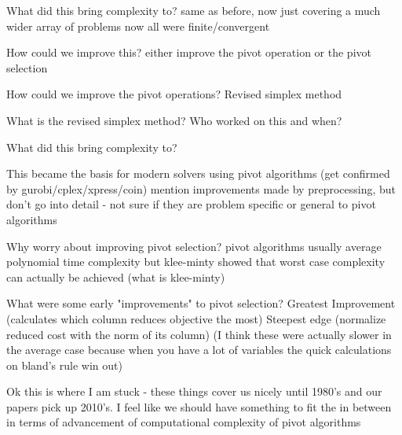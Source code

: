 \documentclass[11pt]{article}
\begin{document}
What did this bring complexity to?
same as before, now just covering a much wider array of problems
now all were finite/convergent

How could we improve this?
either improve the pivot operation or the pivot selection

How could we improve the pivot operations?
Revised simplex method

What is the revised simplex method? Who worked on this and when?

What did this bring complexity to?

This became the basis for modern solvers using pivot algorithms (get confirmed by gurobi/cplex/xpress/coin)
mention improvements made by preprocessing, but don't go into detail - not sure if they are problem specific or general to pivot algorithms

Why worry about improving pivot selection?
pivot algorithms usually average polynomial time complexity
but klee-minty showed that worst case complexity can actually be achieved
(what is klee-minty)

What were some early "improvements" to pivot selection?
Greatest Improvement (calculates which column reduces objective the most)
Steepest edge (normalize reduced cost with the norm of its column)
(I think these were actually slower in the average case because when you have a lot of variables the quick calculations on bland's rule win out)

Ok this is where I am stuck - these things cover us nicely until 1980's and our papers pick up 2010's. I feel like we should have something to fit the in between in terms of advancement of computational complexity of pivot algorithms
\end{document}
